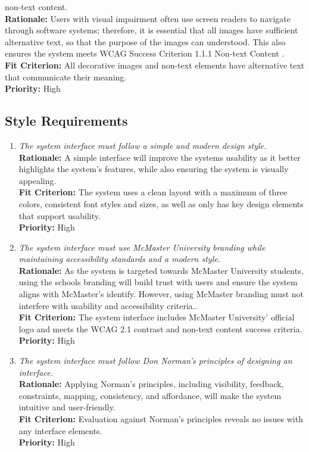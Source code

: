 \documentclass[12pt]{article}
\begin{document}
\begin{enumerate}[label=LFR-AR \arabic*., wide=0pt, leftmargin=*]
{    non-text content.}\\[2mm]
    {\bf Rationale:} Users with visual impairment often use screen
    readers to navigate through software systems; therefore, it is
    essential that all images have sufficient alternative text, so
    that the purpose of the images can understood. This also ensures
    the system meets WCAG Success Criterion 1.1.1 Non-text Content  .\\
    {\bf Fit Criterion:} All decorative images and non-text elements
    have alternative text that communicate their meaning. \\
    {\bf Priority:} High
\end{enumerate}

\subsection{Style Requirements}
\begin{enumerate}[label=LFR-SR \arabic*., wide=0pt, leftmargin=*]
  \item \emph{The system interface must follow a simple and modern
    design style.}\\[2mm]
    {\bf Rationale:} A simple interface will improve the systems
    usability as it better highlights the system's features, while
    also ensuring the system is visually appealing.\\
    {\bf Fit Criterion:} The system uses a clean layout with a
    maximum of three colors, consistent font styles and sizes, as
    well as only has key design elements that support usability. \\
    {\bf Priority:} High
\item \emph{The system interface must use McMaster University branding while maintaining accessibility standards and a modern style.}\\[2mm] 
    {\bf Rationale:} As the system is targeted towards McMaster University students, using the schools branding will build trust with users and ensure the system aligns with McMaster's identify. However, using McMaster branding must not interfere with usability and accessibility criteria..\\
    {\bf Fit Criterion:} The system interface includes McMaster University' official logo and meets the WCAG 2.1 contrast and non-text content success criteria. \\
    {\bf Priority:} High
\item \emph{The system interface must follow Don Norman's principles of designing an interface.}\\[2mm] 
    {\bf Rationale:} Applying Norman's principles, including visibility, feedback, constraints, mapping, consistency, and affordance, will make the system intuitive and user-friendly.\\
    {\bf Fit Criterion:} Evaluation against Norman's principles reveals no issues with any interface elements.\\
    {\bf Priority:} High
\end{enumerate}
\end{document}
